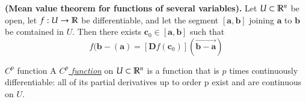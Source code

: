 
\begin{theorem}
  \textbf{(Mean value theorem for functions of several variables).} Let $U \subset \mathbb{R}^n$ be open, let $f : U \to \mathbb{R}$ be differentiable, and let the segment $[\bm{a},\bm{b}]$ joining $\bm{a}$ to $\bm{b}$ be comtained in $U$. Then there exists $\bm{c}_0\in [\bm{a},\bm{b}]$ such that
  \[f(\bm{b}-(\bm{a})= [\bm{D}f(\bm{c}_0)](\vec{\bm{b}-\bm{a}})\]
\end{theorem}

\begin{defn}{$C^p$ function}
A \ul{$C^p$ \emph{function}} on $U\subset \mathbb{R}^n$ is a function that is $p$ times continuously differentiable: all of its partial derivatives up to order p exist and are continuous on $U$.
\end{defn}

